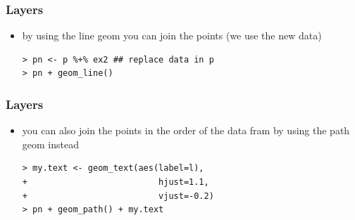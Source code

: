 \documentclass[xcolor={table},c]{beamer}
\begin{document}
\begin{frame}[fragile]\frametitle{Layers}
  \begin{itemize}
  \item by using the line geom you can join the points (we use the new data)
\begin{verbatim}
> pn <- p %+% ex2 ## replace data in p
> pn + geom_line()
\end{verbatim}
  \end{itemize}
\begin{center}
\end{center}
\end{frame}

\begin{frame}[fragile]\frametitle{Layers}
  \begin{itemize}
  \item you can also join the points in the order of the data fram by using the path geom instead\footnotesize
\begin{verbatim}
> my.text <- geom_text(aes(label=l), 
+                          hjust=1.1, 
+                          vjust=-0.2)
> pn + geom_path() + my.text
\end{verbatim}
  \end{itemize}
\begin{center}
\end{center}
\end{frame}
\end{document}
